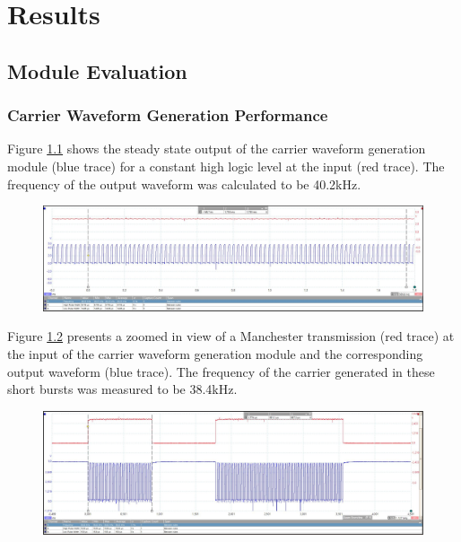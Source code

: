 \chapter{Results} %
\label{ch_results}






\section{Module Evaluation}

\subsection{Carrier Waveform Generation Performance}

Figure \ref{fig:carrier_steady_state} shows the steady state output of the carrier waveform generation module (blue trace) for a constant high logic level at the input (red trace). The frequency of the output waveform was calculated to be 40.2kHz.

\begin{figure}[H]
	\centering
	\includegraphics[width=.9\linewidth]{figures/results/carrier_waveform_generation/steady_state.JPG}
	\label{fig:carrier_steady_state}
\end{figure}

Figure \ref{fig:carrier_manchester_zoomed_view} presents a zoomed in view of a Manchester transmission (red trace) at the input of the carrier waveform generation module and the corresponding output waveform (blue trace). The frequency of the carrier generated in these short bursts was measured to be 38.4kHz.

\begin{figure}[H]
	\centering
	\includegraphics[width=.9\linewidth]{figures/results/carrier_waveform_generation/manchester_zoomed_view.JPG}
	\label{fig:carrier_manchester_zoomed_view}
\end{figure}

